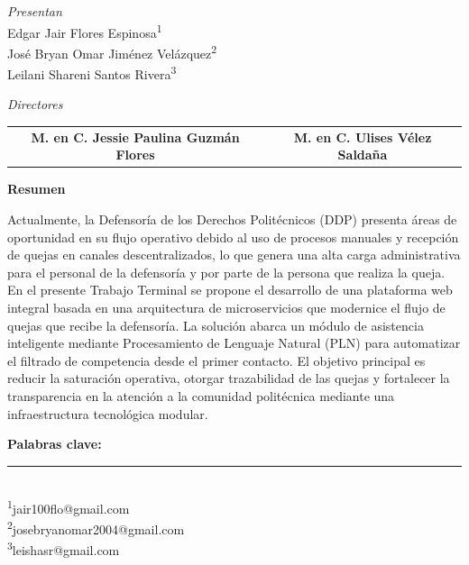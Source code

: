 \documentclass[12pt, letterpaper]{article}
\begin{document}
\vspace{0.6cm}

\begin{center}
    {\itshape Presentan}\\[0.3cm]
    Edgar Jair Flores Espinosa\textsuperscript{1}\\[0.1cm]
    José Bryan Omar Jiménez Velázquez\textsuperscript{2}\\[0.1cm]
    Leilani Shareni Santos Rivera\textsuperscript{3}
\end{center}

\vspace{0.6cm}

\begin{center}
    {\itshape Directores}\\[0.3cm]
    \begin{tabular}{cc}
        \textbf{M. en C. Jessie Paulina Guzmán Flores} & \textbf{M. en C. Ulises Vélez Saldaña}
    \end{tabular}
\end{center}

\vspace{0.7cm}

\noindent\textbf{Resumen}

\vspace{0.2cm}
\noindent Actualmente, la Defensoría de los Derechos Politécnicos (DDP) presenta áreas de oportunidad en su flujo operativo debido al uso de procesos manuales y recepción de quejas en canales descentralizados, lo que genera una alta carga administrativa para el personal de la defensoría y por parte de la persona que realiza la queja. En el presente Trabajo Terminal se propone el desarrollo de una plataforma web integral basada en una arquitectura de microservicios que modernice el flujo de quejas que recibe la defensoría. La solución abarca un módulo de asistencia inteligente mediante Procesamiento de Lenguaje Natural (PLN) para automatizar el filtrado de competencia desde el primer contacto. El objetivo principal es reducir la saturación operativa, otorgar trazabilidad de las quejas y fortalecer la transparencia en la atención a la comunidad politécnica mediante una infraestructura tecnológica modular.

\vspace{0.4cm}
\noindent\textbf{Palabras clave:}

\vfill

\noindent\rule{0.45\textwidth}{0.4pt}\\
{\small \textsuperscript{1}jair100flo@gmail.com}\\
{\small \textsuperscript{2}josebryanomar2004@gmail.com}\\
{\small \textsuperscript{3}leishasr@gmail.com}
\end{document}
